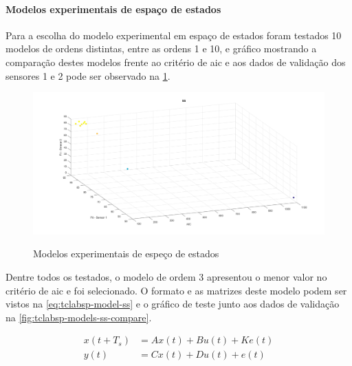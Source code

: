 \paragraph*{\textbf{Modelos experimentais de espaço de estados}}
\label{par:modelos_experimentais_ss}

Para a escolha do modelo experimental em espaço de estados foram testados 10 modelos de ordens distintas,
entre as ordens 1 e 10, e gráfico mostrando a comparação destes modelos frente ao critério de \acrshort{aic}
e aos dados de validação dos sensores 1 e 2 pode ser observado na \cref{fig:tclabsp-models-ss}.

\begin{figure}[h]
	\caption{Modelos experimentais de espeço de estados}
	\begin{center}
		\includegraphics[width=1.00\textwidth]{./5_images/tclabsp-models-SS.png} 
		\label{fig:tclabsp-models-ss}
	\end{center}
	\centering
\end{figure}

Dentre todos os testados, o modelo de ordem 3 apresentou o menor valor no critério de \acrshort{aic} e foi
selecionado. O formato e as matrizes deste modelo podem ser vistos na \cref{eq:tclabsp-model-ss}
e o gráfico de teste junto aos dados de validação na \cref{fig:tclabsp-models-ss-compare}.

\begin{equation}
	\label{eq:tclabsp-model-ss}
	\begin{aligned}
		x(t + T_s) &= Ax(t) + Bu(t) + Ke(t)	\\
		y(t) &= Cx(t) + Du(t) + e(t)		\\
	\end{aligned}
\end{equation}

